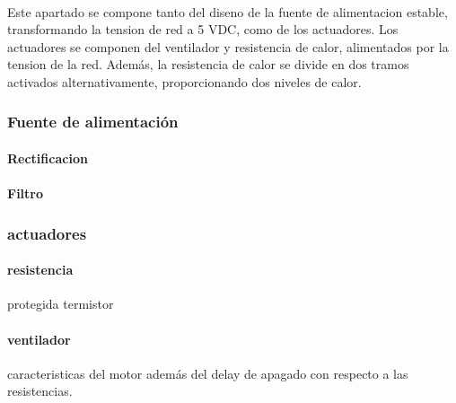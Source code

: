 \paragraph{}
Este apartado se compone tanto del diseno de la fuente de alimentacion estable, transformando la tension de red a 5 VDC, como de los actuadores.
Los actuadores se componen del ventilador y resistencia de calor, alimentados por la tension de la red.
Además, la resistencia de calor se divide en dos tramos activados alternativamente, proporcionando dos niveles de calor.

\subsubsection{Fuente de alimentación}
\paragraph{Rectificacion}
\paragraph{Filtro}

\subsubsection{actuadores}
\paragraph{resistencia}
protegida termistor
\paragraph{ventilador}
caracteristicas del motor además del delay de apagado con respecto a las resistencias.
